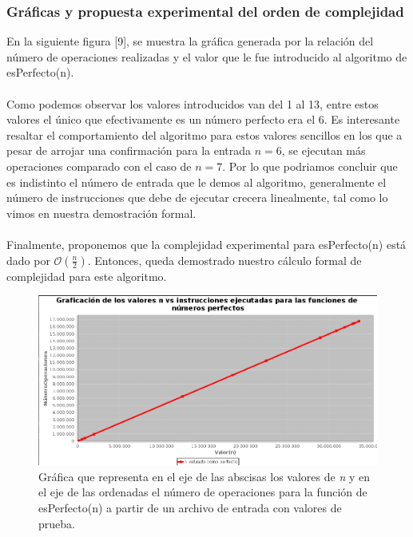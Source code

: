 \documentclass{report}
\begin{document}
        \subsubsection*{Gráficas y propuesta experimental del orden de complejidad}
            En la siguiente figura [9], se muestra la gráfica generada por la relación del número de operaciones realizadas y el valor que le fue introducido al algoritmo de esPerfecto(n).\\\\
            Como podemos observar los valores introducidos van del 1 al 13, entre estos valores el único que efectivamente es un número perfecto era el 6. Es interesante resaltar el comportamiento del algoritmo para estos valores sencillos en los que a pesar de arrojar una confirmación para la entrada $n=6$, se ejecutan más operaciones comparado con el caso de $n=7$. Por lo que podriamos concluir que es indistinto el número de entrada que le demos al algoritmo, generalmente el número de instrucciones que debe de ejecutar crecera linealmente, tal como lo vimos en nuestra demostración formal.
            \\\\Finalmente, proponemos que la complejidad experimental para esPerfecto(n) está dado por $\mathcal{O}(\frac{n}{2})$. Entonces, queda demostrado nuestro cálculo formal de complejidad para este algoritmo.
            \begin{figure}[!h]
                \centering
        	    \includegraphics[width=14cm]{Imagenes/esPerfecto1.png}
                \caption{Gráfica que representa en el eje de las abscisas los valores de \textit{n} y en el eje de las ordenadas el número de operaciones para la función de esPerfecto(n) a partir de un archivo de entrada con valores de prueba.}
                \label{fig:my_label}
            \end{figure}
         \newpage
         
\end{document}
